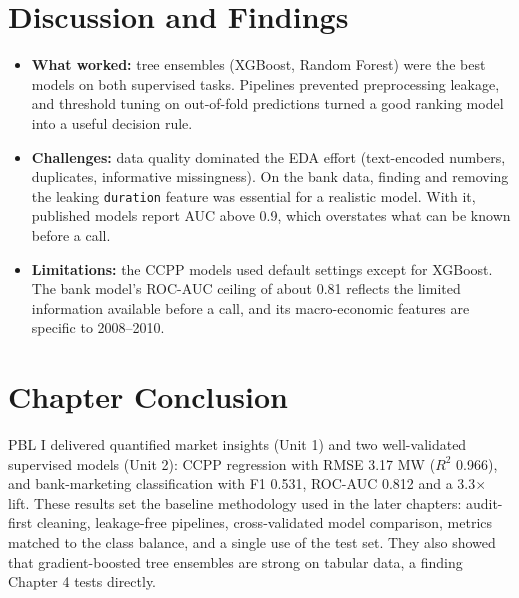 \section{Discussion and Findings}
\begin{itemize}
\item \textbf{What worked:} tree ensembles (XGBoost, Random Forest) were the best models on both supervised tasks.
Pipelines prevented preprocessing leakage, and threshold tuning on out-of-fold predictions turned a good ranking model
into a useful decision rule.
\item \textbf{Challenges:} data quality dominated the EDA effort (text-encoded numbers, duplicates, informative
missingness). On the bank data, finding and removing the leaking \texttt{duration} feature was essential for a realistic
model. With it, published models report AUC above 0.9, which overstates what can be known before a call.
\item \textbf{Limitations:} the CCPP models used default settings except for XGBoost. The bank model's ROC-AUC ceiling of
about 0.81 reflects the limited information available before a call, and its macro-economic features are specific to
2008–2010.
\end{itemize}

\section{Chapter Conclusion}
PBL I delivered quantified market insights (Unit 1) and two well-validated supervised models (Unit 2): CCPP regression
with RMSE 3.17 MW ($R^2$ 0.966), and bank-marketing classification with F1 0.531, ROC-AUC 0.812 and a 3.3$\times$ lift.
These results set the baseline methodology used in the later chapters: audit-first cleaning, leakage-free pipelines,
cross-validated model comparison, metrics matched to the class balance, and a single use of the test set. They also
showed that gradient-boosted tree ensembles are strong on tabular data, a finding Chapter 4 tests directly.
